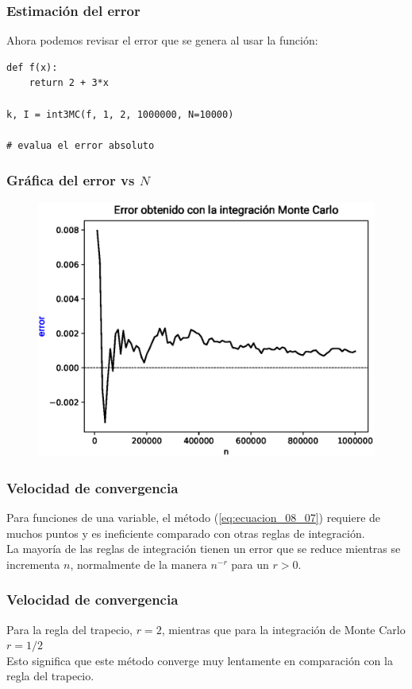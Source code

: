 \documentclass[12pt]{beamer}
\begin{document}
\begin{frame}
\frametitle{Estimación del error}
Ahora podemos revisar el error que se genera al usar la función:
\begin{lstlisting}[caption=Estimación del error del procedimiento]
def f(x):
    return 2 + 3*x

k, I = int3MC(f, 1, 2, 1000000, N=10000)

# evalua el error absoluto
\end{lstlisting}
\end{frame}
\begin{frame}[fragile]
\frametitle{Gráfica del error vs $N$}
\begin{figure}
	\centering
	\includegraphics[scale=0.55]{Imagenes/integracionMC01_2017.eps}
\end{figure}
\end{frame}
\begin{frame}
\frametitle{Velocidad de convergencia}
Para funciones de una variable, el método (\ref{eq:ecuacion_08_07}) requiere de muchos puntos y es ineficiente comparado con otras reglas de integración.
\\
\bigskip
\pause
La mayoría de las reglas de integración tienen un error que se reduce mientras se incrementa $n$, normalmente de la manera $n^{-r}$ para un $r > 0$.
\end{frame}
\begin{frame}
\frametitle{Velocidad de convergencia}
Para la regla del trapecio, $r = 2$, mientras que para la integración de Monte Carlo $r = 1/2$
\\
\bigskip
\pause
Esto significa que este método converge muy lentamente en comparación con la regla del trapecio.
\end{frame}
\end{document}
